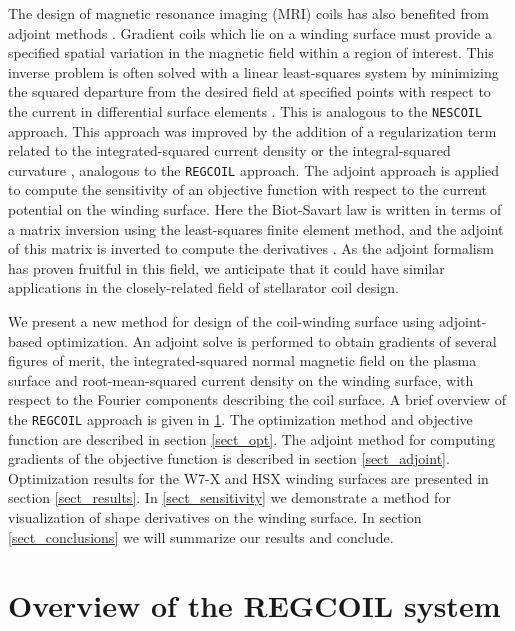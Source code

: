\documentclass[aps,unsortedaddress]{revtex4-1}
\begin{document}
The design of magnetic resonance imaging (MRI) coils has also benefited from adjoint methods \cite{Jia2014}. 
Gradient coils which lie on a winding surface must provide a specified spatial variation in the magnetic field within a region of interest. This inverse problem is often solved with a linear least-squares system by minimizing the squared departure from the desired field at specified points with respect to the current in differential surface elements \cite{Turner1993}. This is analogous to the \texttt{NESCOIL} \cite{Merkel1987} approach. This approach was improved by the addition of a regularization term related to the integrated-squared current density \cite{Forbes2005} or the integral-squared curvature \cite{Forbes2001}, analogous to the \texttt{REGCOIL} approach. The adjoint approach is applied to compute the sensitivity of an objective function with respect to the current potential on the winding surface. Here the Biot-Savart law is written in terms of a matrix inversion using the least-squares finite element method, and the adjoint of this matrix is inverted to compute the derivatives \cite{Jia2014}. As the adjoint formalism has proven fruitful in this field, we anticipate that it could have similar applications in the closely-related field of stellarator coil design. 

We present a new method for design of the coil-winding surface using adjoint-based optimization. An adjoint solve is performed to obtain gradients of several figures of merit, the integrated-squared normal magnetic field on the plasma surface and root-mean-squared current density on the winding surface, with respect to the Fourier components describing the coil surface. A brief overview of the \texttt{REGCOIL} approach is given in \ref{section_REGCOIL}. The optimization method and objective function are described in section \ref{sect_opt}. The adjoint method for computing gradients of the objective function is described in section \ref{sect_adjoint}. Optimization results for the W7-X and HSX winding surfaces are presented in section \ref{sect_results}. In \ref{sect_sensitivity} we demonstrate a method for visualization of shape derivatives on the winding surface. In section \ref{sect_conclusions} we will summarize our results and conclude. 

\section{Overview of the REGCOIL system}
\label{section_REGCOIL}
\end{document}
